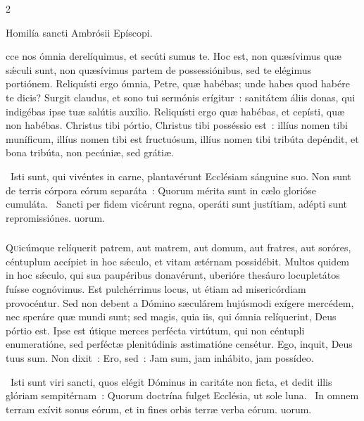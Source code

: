 \documentclass[9pt,twoside]{extarticle}
\begin{document}
\begin{multicols}{2}
{{{\begin{center}Homilía sancti Ambrósii Epíscopi.\\
\end{center}
cce nos ómnia derelíquimus, et secúti sumus te. Hoc est, non quæsívimus quæ sǽculi sunt, non quæsívimus partem de possessiónibus, sed te elégimus portiónem. Reliquísti ergo ómnia, Petre, quæ habébas; unde habes quod habére te dicis? Surgit claudus, et sono tui sermónis erígitur~: sanitátem áliis donas, qui indigébas ipse tuæ salútis auxílio. Reliquísti ergo quæ habébas, et cepísti, quæ non habébas. Christus tibi pórtio, Christus tibi posséssio est~: illíus nomen tibi muníficum, illíus nomen tibi est fructuósum, illíus nomen tibi tribúta depéndit, et bona tribúta, non pecúniæ, sed grátiæ.

\begin{tightlist}{}
\item {}~Isti sunt, qui vivéntes in carne, plantavérunt Ecclésiam sánguine suo. Non sunt de terris córpora eórum separáta~: \textred{*} Quorum mérita sunt in cælo glorióse cumuláta. ~Sancti per fidem vicérunt regna, operáti sunt justítiam, adépti sunt repromissiónes. uorum.
\end{tightlist}

\subsubsection*{\center {}}
\lettrine{Q}uicúmque relíquerit patrem, aut matrem, aut domum, aut fratres, aut soróres, céntuplum accípiet in hoc sǽculo, et vitam ætérnam possidébit. Multos quidem in hoc sǽculo, qui sua paupéribus donavérunt, uberióre thesáuro locupletátos fuísse cognóvimus. Est pulchérrimus locus, ut étiam ad misericórdiam provocéntur. Sed non debent a Dómino sæculárem hujúsmodi exígere mercédem, nec speráre quæ mundi sunt; sed magis, quia iis, qui ómnia relíquerint, Deus pórtio est. Ipse est útique merces perfécta virtútum, qui non céntupli enumeratióne, sed perféctæ plenitúdinis æstimatióne censétur. Ego, inquit, Deus tuus sum. Non dixit~: Ero, sed~: Jam sum, jam inhábito, jam possídeo.

\begin{tightlist}{}
\item {}~Isti sunt viri sancti, quos elégit Dóminus in caritáte non ficta, et dedit illis glóriam sempitérnam~: \textred{*} Quorum doctrína fulget Ecclésia, ut sole luna. ~In omnem terram exívit sonus eórum, et in fines orbis terræ verba eórum. uorum.
\end{tightlist}

}}}
\end{multicols}
\end{document}
